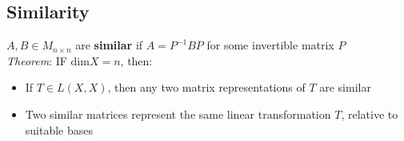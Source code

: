 \documentclass{article}
\begin{document}
\subsection{Similarity}
$A,B\in M_{n\times n}$ are \textbf{similar} if $A=P^{-1} BP$ for some invertible matrix $P$ 
\smallskip \\
\textit{Theorem}: IF $\text{dim}X=n$, then:
\begin{itemize}
	\item If $T\in L(X,X)$, then any two matrix representations of $T$ are similar 
	\item Two similar matrices represent the same linear transformation $T$, relative to suitable bases
\end{itemize}



\end{document}
